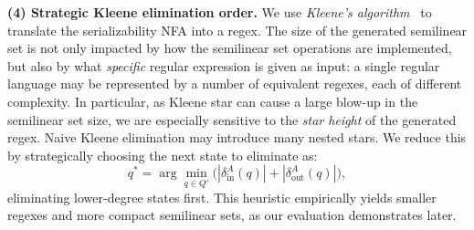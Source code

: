 

\medskip
\noindent
\textbf{(4) Strategic Kleene elimination order.} 
%
We use \textit{Kleene's algorithm}~\cite{Kl56} to translate the serializability NFA into a regex.
% 
The size of the generated semilinear set is not only impacted by how the
	semilinear set operations are implemented, but also by what \textit{specific} regular
	expression is given as input: a single regular language may be represented by a
	number of equivalent regexes, each of different complexity.
	In particular, as Kleene star can cause a large blow-up in the semilinear set size,
	we are especially sensitive to the \emph{star height} of the generated regex.
	Naive Kleene elimination may introduce many nested stars.  
	We reduce this by strategically choosing the next state to eliminate as:
	\[
	q^*=\arg\min_{q\in Q'}\bigl(|\delta^A_{\mathrm{in}}(q)|+|\delta^A_{\mathrm{out}}(q)|\bigr),
	\]
	eliminating lower-degree states first.  
	This heuristic empirically yields smaller regexes and more compact semilinear sets, as our evaluation demonstrates later.


